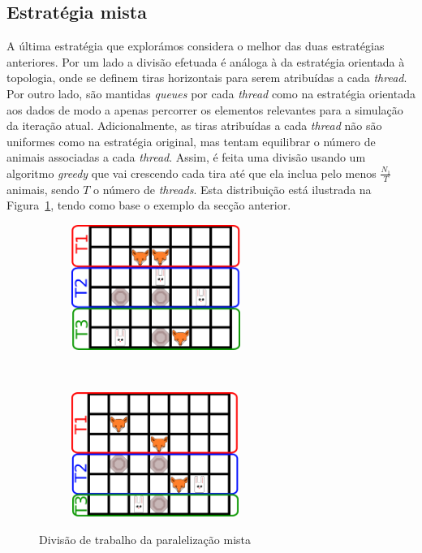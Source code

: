 \documentclass[10pt,a4paper,oneside]{article}
\begin{document}
\subsection{Estratégia mista}
A última estratégia que explorámos considera o melhor das duas
estratégias anteriores. Por um lado a divisão efetuada é análoga à da
estratégia orientada à topologia, onde se definem tiras horizontais
para serem atribuídas a cada \textit{thread}. Por outro lado, são
mantidas \textit{queues} por cada \textit{thread} como na estratégia
orientada aos dados de modo a apenas percorrer os elementos relevantes
para a simulação da iteração atual. Adicionalmente, as tiras
atribuídas a cada \textit{thread} não são uniformes como na estratégia
original, mas tentam equilibrar o número de animais associadas a cada
\textit{thread}. Assim, é feita uma divisão usando um algoritmo
\textit{greedy} que vai crescendo cada tira até que ela inclua pelo
menos $\frac{N_1}{T}$ animais, sendo $T$ o número de
\textit{threads}. Esta distribuição está ilustrada
na Figura~\ref{fig:par3}, tendo como base o exemplo da secção
anterior.

\begin{figure}[H]
    \centering
    \begin{subfigure}[b]{0.4\textwidth}
      \centering
      \includegraphics[height=1.6in]{grid1_par3.png}
    \end{subfigure}
    ~
    \begin{subfigure}[b]{0.4\textwidth}
      \centering
      \includegraphics[height=1.6in]{grid2_par3.png}
    \end{subfigure}
    \caption{Divisão de trabalho da paralelização mista}
    \label{fig:par3}
\end{figure}
\end{document}
